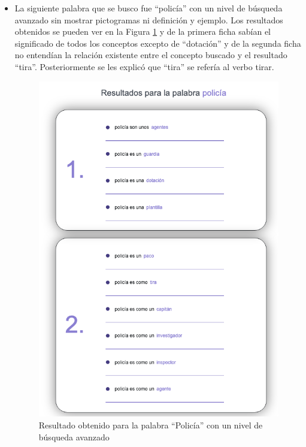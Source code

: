 \begin{itemize}
	
	\item La siguiente palabra que se busco fue ``policía'' con un nivel de búsqueda avanzado sin mostrar pictogramas ni definición y ejemplo. Los resultados obtenidos se pueden ver en la Figura \ref{fig:policiaAvanzado} y de la primera ficha sabían el significado de todos los conceptos excepto de ``dotación'' y de la segunda ficha no entendían la relación existente entre el concepto buscado y el resultado ``tira''. Posteriormente se les explicó que ``tira'' se refería al verbo tirar.
	\begin{figure}[!h]
		\includegraphics[width=.7\textwidth]{Imagenes/Bitmap/Capitulo4/EvaluacionFinal/5policiaavanzado.png}
		\centering
		\caption{Resultado obtenido para la palabra ``Policía'' con un nivel de búsqueda avanzado}
		\label{fig:policiaAvanzado}
	\end{figure}
	

\end{itemize}

